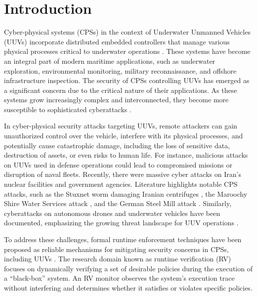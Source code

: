 
\chapter{Introduction}
\graphicspath{{Chapter_1/Vector/}{Chapter_1/}}


Cyber-physical systems (CPSs) in the context of Underwater Unmanned Vehicles (UUVs) incorporate distributed embedded controllers that manage various physical processes critical to underwater operations \cite{lee2008cyber}. These systems have become an integral part of modern maritime applications, such as underwater exploration, environmental monitoring, military reconnaissance, and offshore infrastructure inspection. The security of CPSs controlling UUVs has emerged as a significant concern due to the critical nature of their applications. As these systems grow increasingly complex and interconnected, they become more susceptible to sophisticated cyberattacks \cite{loukas2015cyber,humayed2017cyber}.

In cyber-physical security attacks targeting UUVs, remote attackers can gain unauthorized control over the vehicle, interfere with its physical processes, and potentially cause catastrophic damage, including the loss of sensitive data, destruction of assets, or even risks to human life. For instance, malicious attacks on UUVs used in defense operations could lead to compromised missions or disruption of naval fleets. Recently, there were massive cyber attacks on Iran's nuclear facilities and government agencies\cite{ET2024Cyberattack}. Literature highlights notable CPS attacks, such as the Stuxnet worm damaging Iranian centrifuges \cite{langner2013kill}, the Maroochy Shire Water Services attack \cite{slay2007lessons}, and the German Steel Mill attack \cite{lee2014german}. Similarly, cyberattacks on autonomous drones and underwater vehicles have been documented, emphasizing the growing threat landscape for UUV operations \cite{yaacoub2020security}.

To address these challenges, formal runtime enforcement techniques\cite{enforceablesecpol,FalconeMFR11,RuntimeNonSafety,FMSD} have been proposed as reliable mechanisms for mitigating security concerns in CPSs, including UUVs \cite{ngo2015runtime,ligatti2009run,pearce2019securing}. The research domain known as runtime verification (RV)\cite{LeuckerS08jlap} focuses on dynamically verifying a set of desirable policies during the execution of a ``black-box'' system. An RV monitor observes the system's execution trace without interfering and determines whether it satisfies or violates specific policies.

